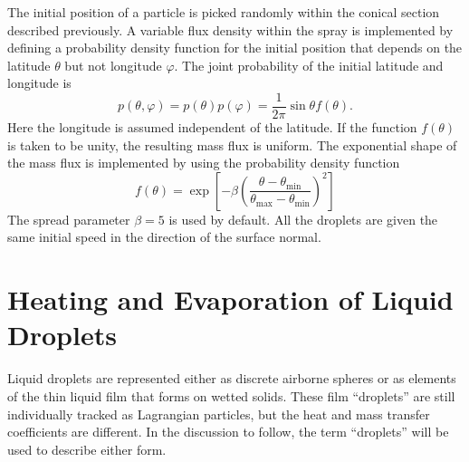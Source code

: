 The initial position of a particle is picked randomly within the conical
section described previously. A variable flux density within the spray is
implemented by defining a probability density function for the initial
position that depends on the latitude $\theta$ but not longitude $\varphi$.
The joint probability of the initial latitude and longitude is
\begin{equation}
  p \left( \theta, \varphi \right) = p \left( \theta \right) p \left( \varphi
  \right) = \frac{1}{2 \pi} \sin \theta f \left( \theta \right) .
\end{equation}
Here the longitude is assumed independent of the latitude. If the function $f \left( \theta \right)$ is taken to be unity, the resulting mass flux is
uniform. The exponential shape of the mass flux is implemented by using the probability density function
\begin{equation}
  f \left( \theta \right) = \exp \left[ - \beta \left( \frac{\theta -
   \theta_{\min}}{\theta_{\max} - \theta_{\min}} \right)^2 \right]
\end{equation}
The spread parameter $\beta = 5$ is used by default. All the droplets are given the same initial speed in the direction of the surface normal. 


\section{Heating and Evaporation of Liquid Droplets}

Liquid droplets are represented either as discrete airborne spheres or as elements of the thin liquid film that forms on wetted solids. These film ``droplets'' are still individually tracked as Lagrangian particles, but the heat and mass transfer coefficients are different. In the discussion to follow, the term ``droplets'' will be used to describe either form.

